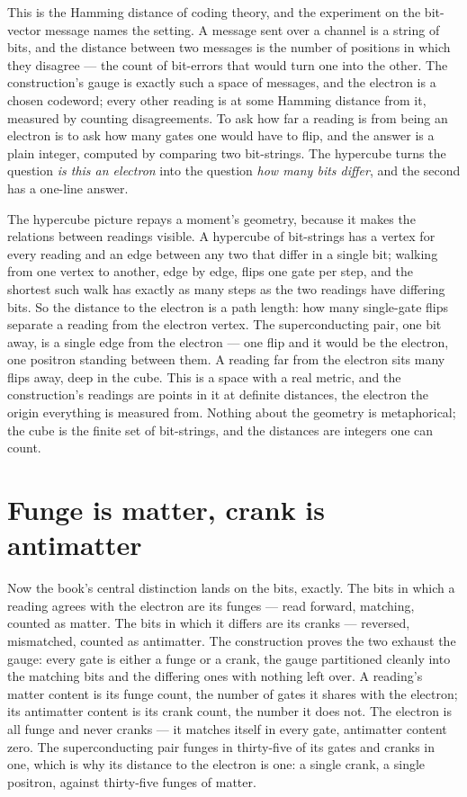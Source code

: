 This is the Hamming distance of coding theory, and the experiment on the bit-vector message names the
setting. A message sent over a channel is a string of bits, and the distance between two messages is the
number of positions in which they disagree --- the count of bit-errors that would turn one into the other.
The construction's gauge is exactly such a space of messages, and the electron is a chosen codeword; every
other reading is at some Hamming distance from it, measured by counting disagreements. To ask how far a
reading is from being an electron is to ask how many gates one would have to flip, and the answer is a
plain integer, computed by comparing two bit-strings. The hypercube turns the question \emph{is this an
electron} into the question \emph{how many bits differ}, and the second has a one-line answer.

The hypercube picture repays a moment's geometry, because it makes the relations between readings visible.
A hypercube of bit-strings has a vertex for every reading and an edge between any two that differ in a
single bit; walking from one vertex to another, edge by edge, flips one gate per step, and the shortest
such walk has exactly as many steps as the two readings have differing bits. So the distance to the
electron is a path length: how many single-gate flips separate a reading from the electron vertex. The
superconducting pair, one bit away, is a single edge from the electron --- one flip and it would be the
electron, one positron standing between them. A reading far from the electron sits many flips away, deep in
the cube. This is a space with a real metric, and the construction's readings are points in it at definite
distances, the electron the origin everything is measured from. Nothing about the geometry is
metaphorical; the cube is the finite set of bit-strings, and the distances are integers one can count.

\section{Funge is matter, crank is antimatter}
\label{se:funge-is-matter-crank-is-antimatter}

Now the book's central distinction lands on the bits, exactly. The bits in which a reading agrees with the
electron are its funges --- read forward, matching, counted as matter. The bits in which it differs are
its cranks --- reversed, mismatched, counted as antimatter. The construction proves the two exhaust the
gauge: every gate is either a funge or a crank, the gauge partitioned cleanly into the matching bits and
the differing ones with nothing left over. A reading's matter content is its funge count, the number of
gates it shares with the electron; its antimatter content is its crank count, the number it does not. The
electron is all funge and never cranks --- it matches itself in every gate, antimatter content zero. The
superconducting pair funges in thirty-five of its gates and cranks in one, which is why its distance to
the electron is one: a single crank, a single positron, against thirty-five funges of matter.

